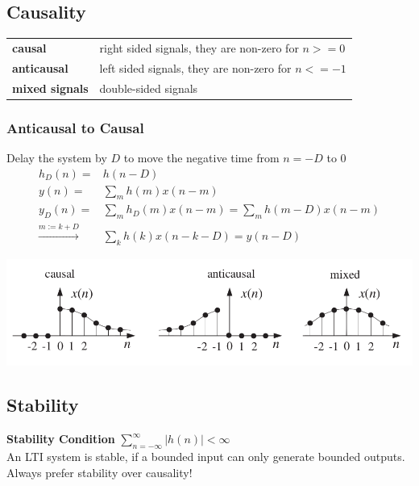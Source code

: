 \begin{multicols}{2}
\subsection{Causality}
\begin{tabular}{lp{4.5cm}}
	\textbf{causal} & right sided signals, they are non-zero for $n>=0$ \\
	\textbf{anticausal} & left sided signals, they are non-zero for $n<=-1$ \\
	\textbf{mixed signals} & double-sided signals \\
\end{tabular}
\vfill

\columnbreak

\subsubsection{Anticausal to Causal}
Delay the system by $D$ to move the negative time from $n=-D$ to $0$
\begin{align*}
h_D(n) =& h(n-D)\\
y(n) =& \sum\limits_{m}h(m)x(n-m) \\
y_D(n) = & \sum\limits_{m}h_D(m)x(n-m) = \sum\limits_{m}h(m-D)x(n-m) \\ 
\xrightarrow{m := k+D}& \sum\limits_{k}h(k)x(n-k-D) = y(n-D)
\end{align*}
\end{multicols}
\includegraphics[width=15cm]{./picture/causality}

\subsection{Stability}
\textbf{Stability Condition} $\sum\limits_{n=-\infty}^{\infty}\left| h(n)
\right| < \infty$\\
An LTI system is stable, if a bounded input can only generate bounded outputs.
Always prefer stability over causality!
